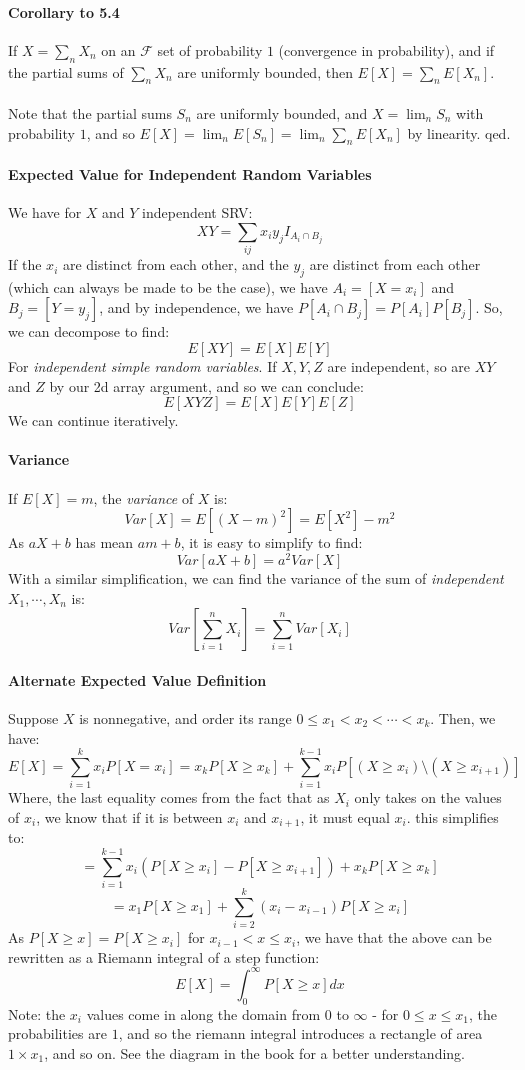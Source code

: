 \documentclass[12pt,a4paper]{article}
\newcommand{\1}[1]{\mathbbm{1}\left\{ #1 \right\}}
\newcommand{\fcal}{\mathcal{F}}
\begin{document}
\paragraph{Corollary to 5.4} If $X = \sum_n X_n$ on an $\fcal$ set of probability $1$ (convergence in probability), and if the partial sums of $\sum_n X_n$ are uniformly bounded, then $E[X] = \sum_n E[X_n]$.
\\\\
Note that the partial sums $S_n$ are uniformly bounded, and $X = \lim_n S_n$ with probability $1$, and so $E[X] = \lim_n E[S_n] = \lim_n \sum_n E[X_n]$ by linearity. qed.

\paragraph{Expected Value for Independent Random Variables} We have for $X$ and $Y$ independent SRV:
$$
	XY = \sum_{ij} x_iy_j I_{A_i \cap B_j}
$$
If the $x_i$ are distinct from each other, and the $y_j$ are distinct from each other (which can always be made to be the case), we have $A_i = [X = x_i]$ and $B_j = [Y = y_j]$, and by independence, we have $P[A_i \cap B_j] = P[A_i]P[B_j]$. So, we can decompose to find:
$$
	E[XY] = E[X]E[Y]
$$
For \textit{independent simple random variables}. If $X,Y,Z$ are independent, so are $XY$ and $Z$ by our 2d array argument, and so we can conclude:
$$
	E[XYZ] = E[X]E[Y]E[Z]
$$
We can continue iteratively.

\paragraph{Variance} If $E[X] = m$, the \textit{variance} of $X$ is:
$$
	Var[X] = E\left[(X-m)^2\right] = E[X^2] - m^2
$$
As $aX + b$ has mean $am + b$, it is easy to simplify to find:
$$
	Var[aX + b] = a^2Var[X]
$$
With a similar simplification, we can find the variance of the sum of \textit{independent} $X_1, \cdots, X_n$ is:
$$
	Var\left[\sum_{i=1}^n X_i\right] = \sum_{i=1}^n Var[X_i]
$$

\paragraph{Alternate Expected Value Definition} Suppose $X$ is nonnegative, and order its range $0 \leq x_1 < x_2 < \cdots < x_k$. Then, we have:
$$
	E[X] = \sum_{i=1}^k x_i P[X = x_i] =
	x_k P[X \geq x_k] +
	\sum_{i=1}^{k-1} x_i P[(X \geq x_i) \setminus (X \geq x_{i+1})]
$$
Where, the last equality comes from the fact that as $X_i$ only takes on the values of $x_i$, we know that if it is between $x_i$ and $x_{i+1}$, it must equal $x_i$. this simplifies to:
$$
	= \sum_{i=1}^{k - 1} x_i\left(P[X \geq x_i] - P[X \geq x_{i+1}]\right) + x_k P[X \geq x_k]
$$
$$
	= x_1 P[X \geq x_1] + \sum_{i=2}^k (x_i - x_{i-1}) P[X \geq x_i]
$$
As $P[X \geq x] = P[X \geq x_i]$ for $x_{i-1} < x \leq x_i$, we have that the above can be rewritten as a Riemann integral of a step function:
$$
	E[X] = \int_0^\infty P[X \geq x] dx
$$
Note: the $x_i$ values come in along the domain from $0$ to $\infty$ - for $0 \leq x \leq x_1$, the probabilities are $1$, and so the riemann integral introduces a rectangle of area $1 \times x_1$, and so on. See the diagram in the book for a better understanding.
\end{document}
